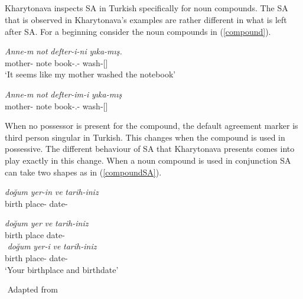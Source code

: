 \subsection{\cite{kharytonava2012word,kharytonava2012taming}}

Kharytonava inspects SA in Turkish specifically for noun compounds. The SA that is observed in Kharytonava's examples are rather different in what is left after SA. For a beginning consider the noun compounds in (\ref{compound}).

\begin{exe}
    \ex \label{compound}
    \begin{xlist}
        \ex \gll
        \textit{Anne-m} \textit{not} \textit{defter-i-ni} \textit{yıka-mış.} \\ mother-{\First}{\Sg} note book-{\Third}{\Sg}.{\Poss}-{\Acc} wash-{\Prf}[{\Third}{\Sg}] \\
        \glt `It seems like my mother washed the notebook'
        
        \ex \gll 
        \textit{Anne-m} \textit{not} \textit{defter-im-i} \textit{yıka-mış} \\ mother-{\First}{\Sg} note book-{\First}{\Sg}.{\Poss}-{\Acc} wash-{\Prf}[{\Third}{\Sg}] \\
    \end{xlist}
\end{exe}

When no possessor is present for the compound, the default agreement marker is third person singular in Turkish. This changes when the compound is used in possessive. The different behaviour of SA that Kharytonava presents comes into play exactly in this change. When a noun compound is used in conjunction SA can take two shapes as in (\ref{compoundSA}).

\begin{exe}
    \ex \label{compoundSA}
    \begin{xlist}
        \ex
        \gll 
        \textit{doğum} \textit{yer-in} \textit{ve} \textit{tarih-iniz} \\ birth place-{\Second}{\Sg} {\And} date-{\Second}{\Pl} \\
        \glt ${}$
        
        \ex \label{compoundSAb}
        \gll 
        \textit{doğum} \textit{yer} \textit{ve} \textit{tarih-iniz} \\ birth place {\And} date-{\Second}{\Pl} \\
        \glt ${}$
        \ex \label{compoundSAc}
        \gll
        \textit{doğum} \textit{yer-i} \textit{ve} \textit{tarih-iniz} \\ birth place-{\Third}{\Sg} {\And} date-{\Second}{\Pl} \\
        \glt `Your birthplace and birthdate'
    \end{xlist}
    ${}$ \hfill Adapted from \cite{kharytonava2012taming}
\end{exe}

